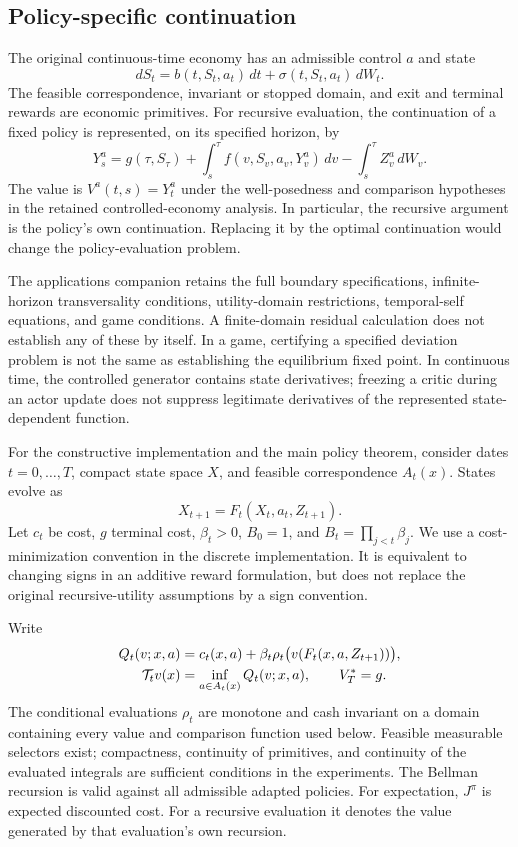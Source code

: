 \documentclass[ecta,nameyear,draft]{econsocart}
\begin{document}
\subsection{Policy-specific continuation}
The original continuous-time economy has an admissible control $a$ and state
\begin{equation}\label{eq:diffusion}
 dS_t=b(t,S_t,a_t)\,dt+\sigma(t,S_t,a_t)\,dW_t.
\end{equation}
The feasible correspondence, invariant or stopped domain, and exit and terminal rewards are economic primitives. For recursive evaluation, the continuation of a fixed policy is represented, on its specified horizon, by
\[
 Y_s^a=g(\tau,S_\tau)+\int_s^\tau f(v,S_v,a_v,Y_v^a)\,dv
                 -\int_s^\tau Z_v^a\,dW_v.
\]
The value is $V^a(t,s)=Y_t^a$ under the well-posedness and comparison hypotheses in the retained controlled-economy analysis. In particular, the recursive argument is the policy's own continuation. Replacing it by the optimal continuation would change the policy-evaluation problem.

The applications companion retains the full boundary specifications, infinite-horizon transversality conditions, utility-domain restrictions, temporal-self equations, and game conditions. A finite-domain residual calculation does not establish any of these by itself. In a game, certifying a specified deviation problem is not the same as establishing the equilibrium fixed point. In continuous time, the controlled generator contains state derivatives; freezing a critic during an actor update does not suppress legitimate derivatives of the represented state-dependent function.

For the constructive implementation and the main policy theorem, consider dates $t=0,\ldots,T$, compact state space $X$, and feasible correspondence $A_t(x)$. States evolve as
\begin{equation}\label{eq:transition}
 X_{t+1}=F_t(X_t,a_t,Z_{t+1}).
\end{equation}
Let $c_t$ be cost, $g$ terminal cost, $\beta_t>0$, $B_0=1$, and $B_t=\prod_{j<t}\beta_j$. We use a cost-minimization convention in the discrete implementation. It is equivalent to changing signs in an additive reward formulation, but does not replace the original recursive-utility assumptions by a sign convention.

Write
\begin{align}\label{eq:bellman}
 Q_t(v;x,a)&=c_t(x,a)+\beta_t\rho_t\bigl(v(F_t(x,a,Z_{t+1}))\bigr),\\
 \mathcal T_tv(x)&=\inf_{a\in A_t(x)}Q_t(v;x,a),\qquad V_T^*=g.\notag
\end{align}
The conditional evaluations $\rho_t$ are monotone and cash invariant on a domain containing every value and comparison function used below. Feasible measurable selectors exist; compactness, continuity of primitives, and continuity of the evaluated integrals are sufficient conditions in the experiments. The Bellman recursion is valid against all admissible adapted policies. For expectation, $J^\pi$ is expected discounted cost. For a recursive evaluation it denotes the value generated by that evaluation's own recursion.
\end{document}
